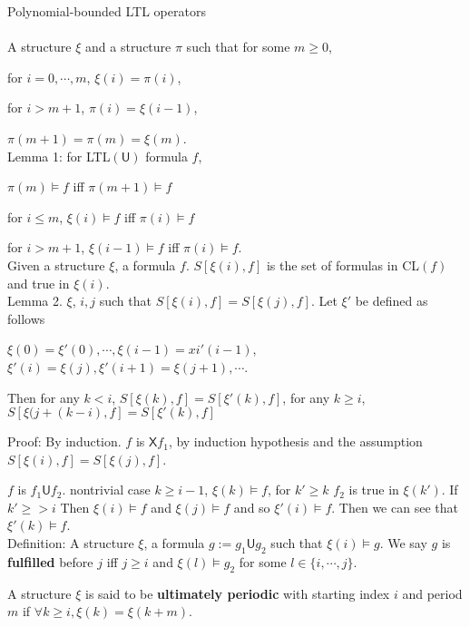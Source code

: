 \documentclass[12pt]{article}
\begin{document}
\begin{CJK*}{GBK}{song}

Polynomial-bounded LTL operators\\ \  \\

A structure $\xi$ and a structure $\pi$ such that for some $m\geq 0$,

for $i=0,\cdots,m$, $\xi(i)=\pi(i)$,

for $i>m+1$, $\pi(i)=\xi(i-1)$,

$\pi(m+1)=\pi(m)=\xi(m)$.\\

Lemma 1: for LTL$(\textsf{U})$ formula $f$,

$\pi(m)\models f$ iff $\pi(m+1)\models f$

for $i\leq m$, $\xi(i)\models f$ iff $\pi(i)\models f$

for $i>m+1$, $\xi(i-1)\models f$ iff $\pi(i)\models f$. \\


Given a structure $\xi$, a formula $f$. $S[\xi(i),f]$ is the set of formulas in CL$(f)$ and true in $\xi(i)$.\\

Lemma 2. $\xi$, $i,j$ such that $S[\xi(i),f]=S[\xi(j),f]$. Let $\xi'$ be defined as follows

$\xi(0)=\xi'(0), \cdots, \xi(i-1)=xi'(i-1)$, $\xi'(i)=\xi(j), \xi'(i+1)=\xi(j+1), \cdots$.

Then for any $k<i$, $S[\xi(k),f]=S[\xi'(k),f]$, for any $k\geq i$, $S[\xi(j+(k-i),f]=S[\xi'(k),f]$

Proof: By induction. $f$ is $\textsf{X} f_1$, by induction hypothesis and the assumption $S[\xi(i),f]=S[\xi(j),f]$.


$f$ is $f_1\textsf{U} f_2$. nontrivial case $k\geq i-1$, $\xi(k)\models f$, for $k'\geq k$ $f_2$ is true in $\xi(k')$. If $k'\geq >i$ Then $\xi(i)\models f$ and $\xi(j)\models f$ and so $\xi'(i)\models f$. Then we can see that $\xi'(k)\models f$.\\


Definition: A structure $\xi$, a formula $g:=g_1\textsf{U} g_2$ such that $\xi(i)\models g$. We say $g$ is {\bf fulfilled} before $j$ iff $j\geq i$ and $\xi(l)\models g_2$ for some $l\in\{i,\cdots,j\}$.

A structure $\xi$ is said to be {\bf ultimately periodic} with starting index $i$ and period $m$ if $\forall k\geq i, \xi(k)=\xi(k+m)$.\\


\end{CJK*}
\end{document}
